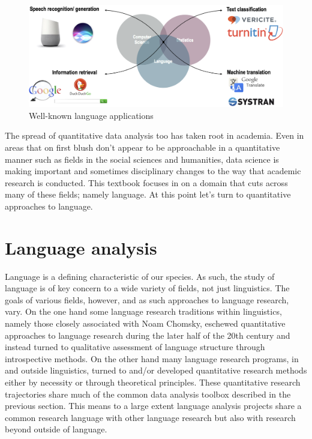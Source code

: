 \documentclass[
  letterpaper,
]{scrbook}
\begin{document}
\begin{figure}[h]

{\centering \includegraphics[width=4.5in,height=\textheight]{./figures/text-analysis/well-known-language-applications.png}

}

\caption{\label{fig-intro-language-applications}Well-known language
applications}

\end{figure}

The spread of quantitative data analysis too has taken root in academia.
Even in areas that on first blush don't appear to be approachable in a
quantitative manner such as fields in the social sciences and
humanities, data science is making important and sometimes disciplinary
changes to the way that academic research is conducted. This textbook
focuses in on a domain that cuts across many of these fields; namely
language. At this point let's turn to quantitative approaches to
language.

\hypertarget{language-analysis}{%
\section{Language analysis}\label{language-analysis}}

Language is a defining characteristic of our species. As such, the study
of language is of key concern to a wide variety of fields, not just
linguistics. The goals of various fields, however, and as such
approaches to language research, vary. On the one hand some language
research traditions within linguistics, namely those closely associated
with Noam Chomsky, eschewed quantitative approaches to language research
during the later half of the 20th century and instead turned to
qualitative assessment of language structure through introspective
methods. On the other hand many language research programs, in and
outside linguistics, turned to and/or developed quantitative research
methods either by necessity or through theoretical principles. These
quantitative research trajectories share much of the common data
analysis toolbox described in the previous section. This means to a
large extent language analysis projects share a common research language
with other language research but also with research beyond outside of
language.
\end{document}
